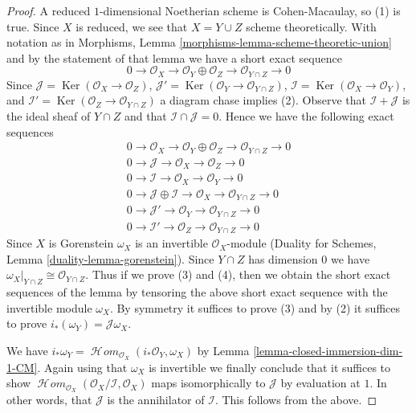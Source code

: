 \documentclass[10pt,a4paper]{amsart}
\theoremstyle{plain}
\theoremstyle{definition}
\theoremstyle{remark}
\numberwithin{equation}{subsection}
\def\SheafHom{\mathop{\mathcal{H}\!\mathit{om}}\nolimits}
\def\Ker{\mathop{\mathrm{Ker}}}
\begin{document}
\begin{proof}
A reduced $1$-dimensional Noetherian scheme is Cohen-Macaulay, so
(1) is true. Since $X$ is reduced, we see that $X = Y \cup Z$
scheme theoretically. With notation as in
Morphisms, Lemma \ref{morphisms-lemma-scheme-theoretic-union}
and by the statement of that lemma
we have a short exact sequence
$$
0 \to \mathcal{O}_X \to
\mathcal{O}_Y \oplus \mathcal{O}_Z \to \mathcal{O}_{Y \cap Z} \to 0
$$
Since $\mathcal{J} = \Ker(\mathcal{O}_X \to \mathcal{O}_Z)$,
$\mathcal{J}' = \Ker(\mathcal{O}_Y \to \mathcal{O}_{Y \cap Z})$,
$\mathcal{I} = \Ker(\mathcal{O}_X \to \mathcal{O}_Y)$, and
$\mathcal{I}' = \Ker(\mathcal{O}_Z \to \mathcal{O}_{Y \cap Z})$
a diagram chase implies (2).
Observe that $\mathcal{I} + \mathcal{J}$ is the ideal sheaf
of $Y \cap Z$ and that $\mathcal{I} \cap \mathcal{J} = 0$.
Hence we have the following exact sequences
\begin{align*}
0 \to \mathcal{O}_X \to \mathcal{O}_Y \oplus \mathcal{O}_Z \to
\mathcal{O}_{Y \cap Z} \to 0 \\
0 \to \mathcal{J} \to \mathcal{O}_X \to \mathcal{O}_Z \to 0 \\
0 \to \mathcal{I} \to \mathcal{O}_X \to \mathcal{O}_Y \to 0 \\
0 \to \mathcal{J} \oplus \mathcal{I} \to \mathcal{O}_X \to
\mathcal{O}_{Y \cap Z} \to 0 \\
0 \to \mathcal{J}' \to \mathcal{O}_Y \to \mathcal{O}_{Y \cap Z} \to 0 \\
0 \to \mathcal{I}' \to \mathcal{O}_Z \to \mathcal{O}_{Y \cap Z} \to 0
\end{align*}
Since $X$ is Gorenstein $\omega_X$ is an invertible $\mathcal{O}_X$-module
(Duality for Schemes, Lemma \ref{duality-lemma-gorenstein}).
Since $Y \cap Z$ has dimension $0$ we have
$\omega_X|_{Y \cap Z} \cong \mathcal{O}_{Y \cap Z}$.
Thus if we prove (3) and (4), then we obtain the short exact
sequences of the lemma by tensoring the above
short exact sequence with the invertible module $\omega_X$.
By symmetry it suffices to prove (3) and by
(2) it suffices to prove $i_*(\omega_Y) = \mathcal{J}\omega_X$.

\medskip\noindent
We have
$i_*\omega_Y = \SheafHom_{\mathcal{O}_X}(i_*\mathcal{O}_Y, \omega_X)$
by Lemma \ref{lemma-closed-immersion-dim-1-CM}.
Again using that $\omega_X$ is invertible
we finally conclude that it suffices to show
$\SheafHom_{\mathcal{O}_X}(\mathcal{O}_X/\mathcal{I}, \mathcal{O}_X)$
maps isomorphically to $\mathcal{J}$ by evaluation at $1$.
In other words, that $\mathcal{J}$ is the annihilator of
$\mathcal{I}$. This follows from the above.
\end{proof}
\end{document}
